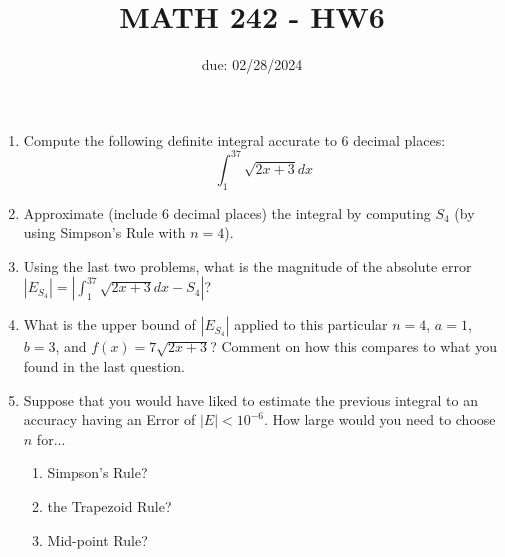 \documentclass[12pt]{article}
\title{MATH 242 - HW6}
\date{due: 02/28/2024}
\begin{document}
\maketitle


\begin{enumerate}

\item Compute the following definite integral accurate to 6 decimal places:
$$\int_1^37\sqrt{2x+3}dx$$
\newpage
\item Approximate (include 6 decimal places) the integral by computing $S_4$ (by using Simpson’s Rule with $n=4$).
\newpage
\item Using the last two problems, what is the magnitude of the absolute error $|E_{S_4}|=|\int_1^37\sqrt{2x+3}dx-S_4|$?
\vfill
\item What is the upper bound of $|E_{S_4}|$ applied to this particular $n=4$, $a=1$, $b=3$, and $f(x)=7\sqrt{2x+3}$? Comment on how this compares to what you found in the last question.

\vfill

\newpage
\item Suppose that you would have liked to estimate the previous integral to an accuracy having an Error  of $|E|<10^{-6}$. How large would you need to choose $n$ for...
\begin{enumerate}
    \item Simpson's Rule?
    \item the Trapezoid Rule?
    \item Mid-point Rule?
\end{enumerate}

\end{enumerate}
\end{document}
